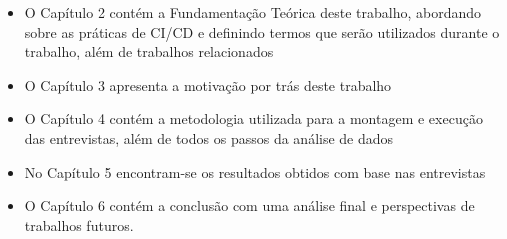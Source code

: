  \begin{itemize}
     \item O Capítulo 2 contém a Fundamentação Teórica deste trabalho, abordando sobre as práticas de CI/CD e definindo termos que serão utilizados durante o trabalho, além de trabalhos relacionados
     \item O Capítulo 3 apresenta a motivação por trás deste trabalho
     \item O Capítulo 4 contém a metodologia utilizada para a montagem e execução das entrevistas, além de todos os passos da análise de dados
     \item No Capítulo 5 encontram-se os resultados obtidos com base nas entrevistas
     \item O Capítulo 6 contém a conclusão com uma análise final e perspectivas de trabalhos futuros.
 \end{itemize}
